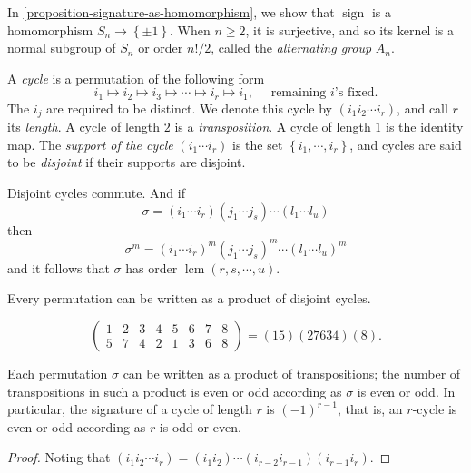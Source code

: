 \begin{definition}
  \label{definition-alternating-group}
  In \ref{proposition-signature-as-homomorphism}, we show that \( \operatorname{sign} \) is a homomorphism \( S_n \to \left\lbrace \pm 1 \right\rbrace \).
  When \( n \geq 2 \), it is surjective, and so its kernel is a normal subgroup of \( S_n \) or order \( n! / 2 \), called the \emph{alternating group} \( A_n \).
\end{definition}

\begin{definition}
  \label{definition-cycle}
  \label{definition-transposition}
  \label{definition-support-cycle}
  \label{definition-cycle-disjoint}
  A \emph{cycle} is a permutation of the following form
  \[
    i_1 \mapsto i_2 \mapsto i_3 \mapsto \cdots \mapsto i_r \mapsto i_1,\quad \text{ remaining } i \text{'s fixed.}
  \]
  The \( i_j \) are required to be distinct.
  We denote this cycle by \( (i_1 i_2 \cdots i_r) \), and call \( r \) its \emph{length}.
  A cycle of length \( 2 \) is a \emph{transposition}.
  A cycle of length \( 1 \) is the identity map.
  The \emph{support of the cycle} \( (i_1 \cdots i_r ) \) is the set \( \left\lbrace i_1, \cdots, i_r \right\rbrace \), and cycles are said to be \emph{disjoint} if their supports are disjoint.
\end{definition}
\begin{remark}
  \label{remark-disjoint-cycles-commute}
  Disjoint cycles commute.
  And if
  \[
    \sigma = (i_1 \cdots i_r)(j_1 \cdots j_s) \cdots (l_1 \cdots l_u)
  \]
  then
  \[
    \sigma^m = (i_1 \cdots i_r)^m(j_1 \cdots j_s)^m \cdots (l_1 \cdots l_u)^m
  \]
  and it follows that \( \sigma \) has order \( \operatorname{lcm}(r,s,\cdots, u) \).
\end{remark}

\begin{proposition}
  \label{proposition-permutation-as-disjoint-cycles}
  Every permutation can be written as a product of disjoint cycles.
\end{proposition}
\begin{example}
  \label{example-permutation-as-disjoint-cycles}
  \[
    \begin{pmatrix}
    1 & 2 & 3 & 4 & 5 & 6 & 7 & 8\\
    5 & 7 & 4 & 2 & 1 & 3 & 6 & 8
    \end{pmatrix} = (15)(27634)(8).
  \]
\end{example}

\begin{corollary}
  \label{proposition-permutation-as-transpositions}
  Each permutation \( \sigma \) can be written as a product of transpositions;
  the number of transpositions in such a product is even or odd according as \( \sigma \) is even or odd.
  In particular, the signature of a cycle of length \( r \) is \( (-1)^{r - 1} \), that is, an \( r \)-cycle is even or odd according as \( r \) is odd or even.
\end{corollary}
\begin{proof}
  Noting that \( (i_1 i_2 \cdots i_r) = (i_1 i_2) \cdots (i_{r - 2}i_{r - 1})(i_{r - 1} i_r) \).
\end{proof}

